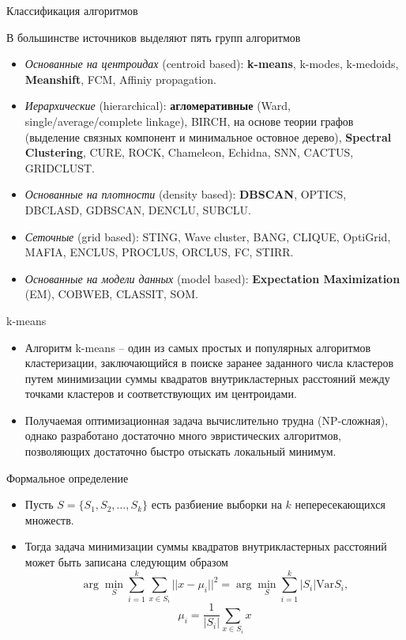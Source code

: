 \documentclass{beamer}
\begin{document}
\begin{frame}{Классификация алгоритмов}
    \small
    
    В большинстве источников выделяют пять групп алгоритмов
    \begin{itemize}
        \item \textit{Основанные на центроидах} (centroid based): \textbf{k-means}, k-modes, k-medoids, \textbf{Meanshift}, FCM, Affiniy propagation.
        \item \textit{Иерархические} (hierarchical): \textbf{агломеративные} (Ward, single/average/complete linkage), BIRCH, на основе теории графов (выделение связных компонент и минимальное остовное дерево), \textbf{Spectral Clustering}, CURE, ROCK, Chameleon, Echidna, SNN, CACTUS, GRIDCLUST.
        \item \textit{Основанные на плотности} (density based): \textbf{DBSCAN}, OPTICS, DBCLASD, GDBSCAN, DENCLU, SUBCLU.
        \item \textit{Сеточные} (grid based): STING, Wave cluster, BANG, CLIQUE, OptiGrid, MAFIA, ENCLUS, PROCLUS, ORCLUS, FC, STIRR.
        \item \textit{Основанные на модели данных} (model based): \textbf{Expectation Maximization} (EM), COBWEB, CLASSIT, SOM.
    \end{itemize}

\end{frame}

\begin{frame}{k-means}
    \small
    
    \begin{itemize}
        \item Алгоритм k-means -- один из самых простых и популярных алгоритмов кластеризации, заключающийся в поиске заранее заданного числа кластеров путем минимизации суммы квадратов внутрикластерных расстояний между точками кластеров и соответствующих им центроидами.
        \item Получаемая оптимизационная задача вычислительно трудна (NP-сложная), однако разработано достаточно много эвристических алгоритмов, позволяющих достаточно быстро отыскать локальный минимум.
    \end{itemize}
\end{frame}

\begin{frame}{Формальное определение}
    \small
    
    \begin{itemize}
        \item Пусть $S=\{ S_1, S_2, \ldots, S_k\}$ есть разбиение выборки на $k$ непересекающихся множеств.
        \item Тогда задача минимизации суммы квадратов внутрикластерных расстояний может быть записана следующим образом
        $$\arg \min_{S} \sum_{i=1}^k \sum_{x \in S_i} ||x - \mu_i||^2 = \arg \min_{S} \sum_{i=1}^k \left | S_i \right | \text{Var} S_i,$$
        $$\mu_i = \frac{1}{\left | S_i \right |} \sum_{x \in S_i} x$$
    \end{itemize}
\end{frame}
\end{document}
